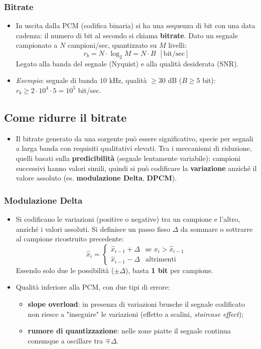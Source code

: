 \documentclass[12pt, a4paper]{article}
\begin{document}
\subsubsection{Bitrate}
\begin{itemize}
    \item In uscita dalla PCM (codifica binaria) si ha una sequenza di bit con una data cadenza: il numero di bit al secondo si chiama \textbf{bitrate}. Dato un segnale campionato a $N$ campioni/sec, quantizzato su $M$ livelli:
    $$r_b = N\cdot\log_2M = N\cdot B\ \ [\text{bit/sec}]$$
    Legato alla banda del segnale (Nyquist) e alla qualità desiderata (SNR).
    \item \textit{Esempio}: segnale di banda $10$ kHz, qualità $\ge30$ dB ($B\ge5$ bit): $r_b \ge 2\cdot10^4\cdot5 = 10^5$ bit/sec.
\end{itemize}

\subsection{Come ridurre il bitrate}
\begin{itemize}
    \item Il bitrate generato da una sorgente può essere significativo, specie per segnali a larga banda con requisiti qualitativi elevati. Tra i meccanismi di riduzione, quelli basati sulla \textbf{predicibilità} (segnale lentamente variabile): campioni successivi hanno valori simili, quindi si può codificare la \textbf{variazione} anziché il valore assoluto (es. \textbf{modulazione Delta}, \textbf{DPCM}).
\end{itemize}

\subsubsection{Modulazione Delta}
\begin{itemize}
    \item Si codificano le variazioni (positive o negative) tra un campione e l'altro, anziché i valori assoluti. Si definisce un passo fisso $\Delta$ da sommare o sottrarre al campione ricostruito precedente:
    $$\hat x_i = \begin{cases}\hat x_{i-1}+\Delta & \text{se } x_i>\hat x_{i-1} \\ \hat x_{i-1}-\Delta & \text{altrimenti}\end{cases}$$
    Essendo solo due le possibilità ($\pm\Delta$), basta \textbf{1 bit} per campione.
    \item Qualità inferiore alla PCM, con due tipi di errore:
    \begin{itemize}
        \item \textbf{slope overload}: in presenza di variazioni brusche il segnale codificato non riesce a "inseguire" le variazioni (effetto a scalini, \textit{staircase effect});
        \item \textbf{rumore di quantizzazione}: nelle zone piatte il segnale continua comunque a oscillare tra $\mp\Delta$.
    \end{itemize}
\end{itemize}
\end{document}

